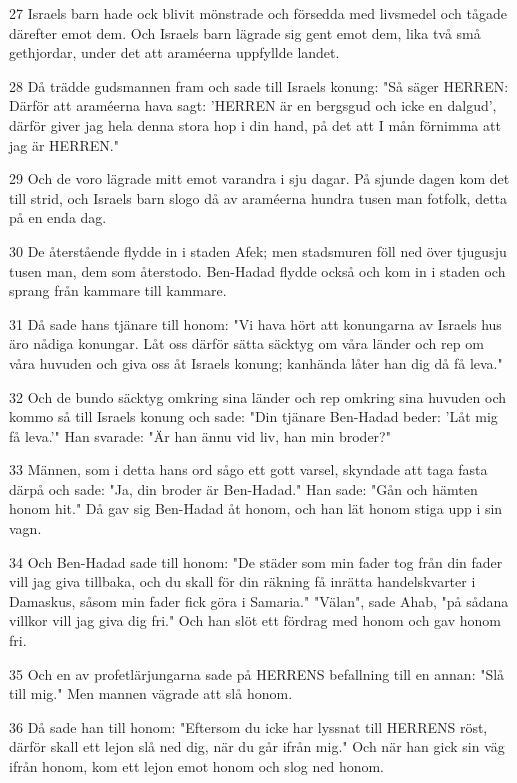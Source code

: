 \par 27 Israels barn hade ock blivit mönstrade och försedda med livsmedel och tågade därefter emot dem. Och Israels barn lägrade sig gent emot dem, lika två små gethjordar, under det att araméerna uppfyllde landet.
\par 28 Då trädde gudsmannen fram och sade till Israels konung: "Så säger HERREN: Därför att araméerna hava sagt: 'HERREN är en bergsgud och icke en dalgud', därför giver jag hela denna stora hop i din hand, på det att I mån förnimma att jag är HERREN."
\par 29 Och de voro lägrade mitt emot varandra i sju dagar. På sjunde dagen kom det till strid, och Israels barn slogo då av araméerna hundra tusen man fotfolk, detta på en enda dag.
\par 30 De återstående flydde in i staden Afek; men stadsmuren föll ned över tjugusju tusen man, dem som återstodo. Ben-Hadad flydde också och kom in i staden och sprang från kammare till kammare.
\par 31 Då sade hans tjänare till honom: "Vi hava hört att konungarna av Israels hus äro nådiga konungar. Låt oss därför sätta säcktyg om våra länder och rep om våra huvuden och giva oss åt Israels konung; kanhända låter han dig då få leva."
\par 32 Och de bundo säcktyg omkring sina länder och rep omkring sina huvuden och kommo så till Israels konung och sade: "Din tjänare Ben-Hadad beder: 'Låt mig få leva.'" Han svarade: "Är han ännu vid liv, han min broder?"
\par 33 Männen, som i detta hans ord sågo ett gott varsel, skyndade att taga fasta därpå och sade: "Ja, din broder är Ben-Hadad." Han sade: "Gån och hämten honom hit." Då gav sig Ben-Hadad åt honom, och han lät honom stiga upp i sin vagn.
\par 34 Och Ben-Hadad sade till honom: "De städer som min fader tog från din fader vill jag giva tillbaka, och du skall för din räkning få inrätta handelskvarter i Damaskus, såsom min fader fick göra i Samaria." "Välan", sade Ahab, "på sådana villkor vill jag giva dig fri." Och han slöt ett fördrag med honom och gav honom fri.
\par 35 Och en av profetlärjungarna sade på HERRENS befallning till en annan: "Slå till mig." Men mannen vägrade att slå honom.
\par 36 Då sade han till honom: "Eftersom du icke har lyssnat till HERRENS röst, därför skall ett lejon slå ned dig, när du går ifrån mig." Och när han gick sin väg ifrån honom, kom ett lejon emot honom och slog ned honom.
